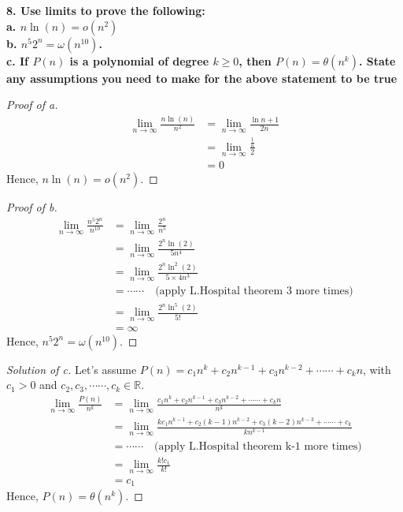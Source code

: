 \documentclass[12pt]{article}
\begin{document}
\noindent \textbf{8. Use limits to prove the following:\\
	a. $n\ln(n)=o(n^2)$\\
	b. $n^5 2^n=\omega(n^{10})$.\\
	c. If $P(n)$ is a polynomial of degree $k\ge0$, then $P(n)=\theta(n^k)$. State any assumptions you need to make for the above statement to be true}
\begin{proof}[Proof of a]
	\begin{align*}
		\lim\limits_{n\to\infty}\frac{n\ln (n)}{n^2}&=\lim\limits_{n\to\infty}\frac{\ln n+1}{2n}\\
		&=\lim\limits_{n\to\infty}\frac{\frac{1}{n}}{2}\\
		&=0
	\end{align*}
	Hence, $n\ln(n)=o(n^2)$.
\end{proof}

\begin{proof}[Proof of b]
	\begin{align*}
		\lim\limits_{n\to\infty}\frac{n^5 2^n}{n^{10}}&=\lim\limits_{n\to\infty}\frac{2^n}{n^5}\\
		&=\lim\limits_{n\to\infty}\frac{2^n\ln(2)}{5n^4}\\
		&=\lim\limits_{n\to\infty}\frac{2^n\ln^2(2)}{5\times4n^3}\\
		&=\cdots\cdots \quad\text{(apply L.Hospital theorem 3 more times)}\\
		&=\lim\limits_{n\to\infty}\frac{2^n\ln^5(2)}{5!}\\
		&=\infty
	\end{align*}
	Hence, $n^5 2^n=\omega(n^{10})$.
\end{proof}

\begin{proof}[Solution of c]
	Let's assume $P(n)=c_1n^k+c_2n^{k-1}+c_3n^{k-2}+\cdots\cdots+c_kn$, with $c_1>0$ and $c_2,c_3,\cdots\cdots,c_k\in\mathbb{R}$.
	\begin{align*}
		\lim\limits_{n\to\infty}\frac{P(n)}{n^k}&=\lim\limits_{n\to\infty}\frac{c_1n^k+c_2n^{k-1}+c_3n^{k-2}+\cdots\cdots+c_kn}{n^k}\\
		&=\lim\limits_{n\to\infty}\frac{kc_1n^{k-1}+c_2(k-1)n^{k-2}+c_3(k-2)n^{k-3}+\cdots\cdots+c_k}{kn^{k-1}}\\
		&=\cdots\cdots \quad\text{(apply L.Hospital theorem k-1 more times)}\\
		&=\lim\limits_{n\to\infty}\frac{k!c_1}{k!}\\
		&=c_1
	\end{align*}
	Hence, $P(n)=\theta(n^k)$.
\end{proof}
\end{document}
